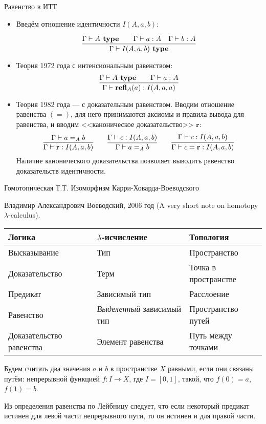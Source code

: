 \documentclass[aspectratio=169,dvipsnames,usenames]{beamer}
\begin{document}
\begin{frame}{Равенство в ИТТ}
\begin{itemize}
\item Введём отношение идентичности $I(A,a,b)$: %

$$\infer{\Gamma\vdash I(A,a,b) \textbf{ type}}{\Gamma\vdash A \textbf{ type}\quad\quad\Gamma\vdash a:A\quad\Gamma\vdash b:A}$$

\item Теория 1972 года с интенсиональным равенством:
$$
\infer{\Gamma\vdash \textbf{refl}_A(a) : I(A,a,a)}{\Gamma\vdash A\textbf{ type}\quad\quad\Gamma\vdash a:A}
$$

\item Теория 1982 года --- с доказательным равенством.
Вводим отношение равенства $(=)$, для него принимаются аксиомы и правила вывода для равенства,
и вводим <<каноническое доказательство>> $\textbf{r}$:
$$
\infer{\Gamma\vdash \textbf{r}:I(A,a,b)}{\Gamma \vdash a =_A b}
\quad\quad
\infer{\Gamma\vdash a=_A b}{\Gamma\vdash c:I(A,a,b)}
\quad\quad
\infer{\Gamma\vdash c=\textbf{r}:I(A,a,b)}{\Gamma \vdash c:I(A,a,b)}
$$
Наличие канонического доказательства позволяет выводить равенство доказательств идентичности.
\end{itemize}
\end{frame}

\begin{frame}{Гомотопическая Т.Т. Изоморфизм Карри-Ховарда-Воеводского}

Владимир Александрович Воеводский, 2006 год (A very short note on homotopy $\lambda$-calculus).

\vspace{0.3cm}

\begin{tabular}{lll}
Логика & $\lambda$-исчисление & Топология\\\hline
Высказывание & Тип & Пространство\\
Доказательство & Терм & Точка в пространстве\\
Предикат & Зависимый тип & Расслоение\\
Равенство &\emph{Выделенный} зависимый тип & Пространство путей\\
Доказательство равенства & Элемент равенства & Путь между точками
\end{tabular}

\begin{dfn}Будем считать два значения $a$ и $b$ в пространстве $X$ равными, если они связаны путём: непрерывной функцией $f:I\rightarrow X$,
где $I = [0,1]$, такой, что $f(0)=a$, $f(1)=b$.\end{dfn}
Из определения равенства по Лейбницу следует, что если некоторый предикат истинен для левой части непрерывного пути, то он истинен и для правой части.
\end{frame}
\end{document}
